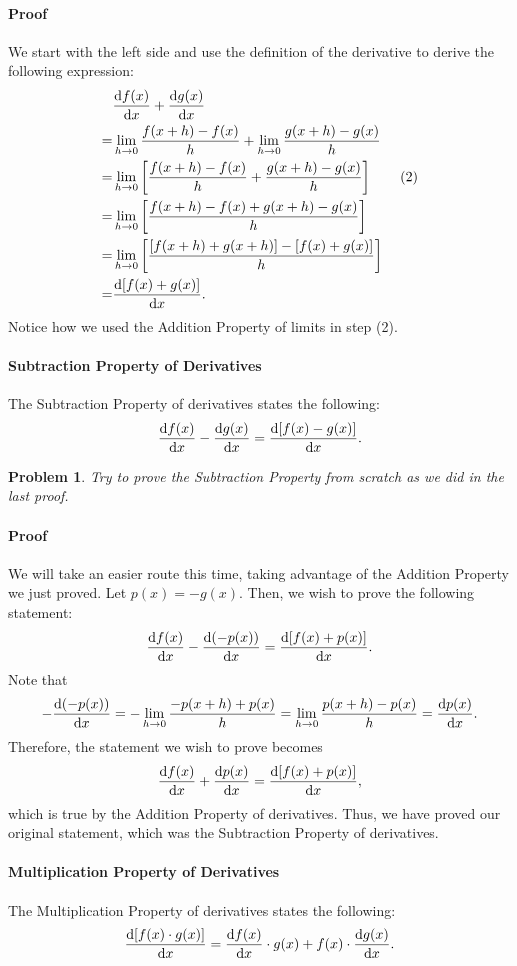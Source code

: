 \documentclass{article}
\newtheorem*{problem}{Problem}
\begin{document}
\paragraph{Proof} We start with the left side and use the definition of the derivative to derive the following expression:
\begin{align*}
    &\diff{f(x)}{x}+\diff{g(x)}{x}\\
    =&\lim_{h\to 0}\frac{f(x+h)-f(x)}{h} + \lim_{h\to 0}\frac{g(x+h)-g(x)}{h}\\
    =&\lim_{h\to 0}\left[\frac{f(x+h)-f(x)}{h} + \frac{g(x+h)-g(x)}{h}\right]\tag{2}\\
    =&\lim_{h\to 0}\left[\frac{f(x+h)-f(x)+g(x+h)-g(x)}{h}\right]\\
    =&\lim_{h\to 0}\left[\frac{[f(x+h)+g(x+h)]-[f(x)+g(x)]}{h}\right]\\
    =&\diff{[f(x)+g(x)]}{x}.
\end{align*}
Notice how we used the Addition Property of limits in step (2). $\boxed{}$

\paragraph{Subtraction Property of Derivatives} The Subtraction Property of derivatives states the following:
\[\diff{f(x)}{x}-\diff{g(x)}{x}=\diff{[f(x)-g(x)]}{x}.\]

\begin{problem}
Try to prove the Subtraction Property from scratch as we did in the last proof.
\end{problem}

\paragraph{Proof} We will take an easier route this time, taking advantage of the Addition Property we just proved. Let $p(x)=-g(x)$. Then, we wish to prove the following statement: 
\[\diff{f(x)}{x}-\diff{(-p(x))}{x}=\diff{[f(x)+p(x)]}{x}.\]
Note that 
\[-\diff{(-p(x))}{x}=-\lim_{h\to 0}\frac{-p(x+h)+p(x)}{h}=\lim_{h\to 0}\frac{p(x+h)-p(x)}{h}=\diff{p(x)}{x}.\]
Therefore, the statement we wish to prove becomes 
\[\diff{f(x)}{x}+\diff{p(x)}{x}=\diff{[f(x)+p(x)]}{x},\]
which is true by the Addition Property of derivatives. Thus, we have proved our original statement, which was the Subtraction Property of derivatives. $\boxed{}$

\paragraph{Multiplication Property of Derivatives} The Multiplication Property of derivatives states the following:
\[\diff{[f(x)\cdot g(x)]}{x}=\diff{f(x)}{x}\cdot g(x) + f(x)\cdot \diff{g(x)}{x}.\]
\end{document}
